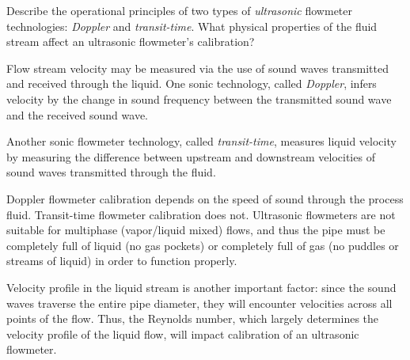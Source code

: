 

Describe the operational principles of two types of {\it ultrasonic} flowmeter technologies: {\it Doppler} and {\it transit-time}.  What physical properties of the fluid stream affect an ultrasonic flowmeter's calibration?







Flow stream velocity may be measured via the use of sound waves transmitted and received through the liquid.  One sonic technology, called {\it Doppler}, infers velocity by the change in sound frequency between the transmitted sound wave and the received sound wave.

Another sonic flowmeter technology, called {\it transit-time}, measures liquid velocity by measuring the difference between upstream and downstream velocities of sound waves transmitted through the fluid.

Doppler flowmeter calibration depends on the speed of sound through the process fluid.  Transit-time flowmeter calibration does not.  Ultrasonic flowmeters are not suitable for multiphase (vapor/liquid mixed) flows, and thus the pipe must be completely full of liquid (no gas pockets) or completely full of gas (no puddles or streams of liquid) in order to function properly.  







Velocity profile in the liquid stream is another important factor: since the sound waves traverse the entire pipe diameter, they will encounter velocities across all points of the flow.  Thus, the Reynolds number, which largely determines the velocity profile of the liquid flow, will impact calibration of an ultrasonic flowmeter.




